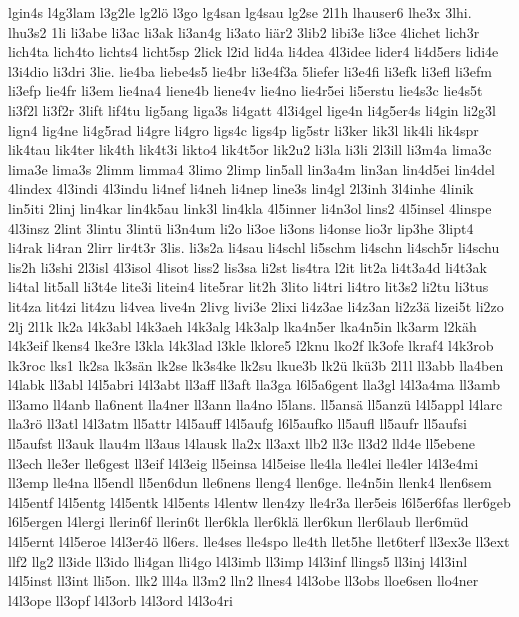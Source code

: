 {lgin4s
l4g3lam
l3g2le
lg2lö
l3go
lg4san
lg4sau
lg2se
2l1h
lhauser6
lhe3x
3lhi.
lhu3s2
1li
li3abe
li3ac
li3ak
li3an4g
li3ato
liär2
3lib2
libi3e
li3ce
4lichet
lich3r
lich4ta
lich4to
lichts4
licht5sp
2lick
l2id
lid4a
li4dea
4l3idee
lider4
li4d5ers
lidi4e
l3i4dio
li3dri
3lie.
lie4ba
liebe4s5
lie4br
li3e4f3a
5liefer
li3e4fi
li3efk
li3efl
li3efm
li3efp
lie4fr
li3em
lie4na4
liene4b
liene4v
lie4no
lie4r5ei
li5erstu
lie4s3c
lie4s5t
li3f2l
li3f2r
3lift
lif4tu
lig5ang
liga3s
li4gatt
4l3i4gel
lige4n
li4g5er4s
li4gin
li2g3l
lign4
lig4ne
li4g5rad
li4gre
li4gro
ligs4c
ligs4p
lig5str
li3ker
lik3l
lik4li
lik4spr
lik4tau
lik4ter
lik4th
lik4t3i
likto4
lik4t5or
lik2u2
li3la
li3li
2l3ill
li3m4a
lima3c
lima3e
lima3s
2limm
limma4
3limo
2limp
lin5all
lin3a4m
lin3an
lin4d5ei
lin4del
4lindex
4l3indi
4l3indu
li4nef
li4neh
li4nep
line3s
lin4gl
2l3inh
3l4inhe
4linik
lin5iti
2linj
lin4kar
lin4k5au
link3l
lin4kla
4l5inner
li4n3ol
lins2
4l5insel
4linspe
4l3insz
2lint
3lintu
3lintü
li3n4um
li2o
li3oe
li3ons
li4onse
lio3r
lip3he
3lipt4
li4rak
li4ran
2lirr
lir4t3r
3lis.
li3s2a
li4sau
li4schl
li5schm
li4schn
li4sch5r
li4schu
lis2h
li3shi
2l3isl
4l3isol
4lisot
liss2
lis3sa
li2st
lis4tra
l2it
lit2a
li4t3a4d
li4t3ak
li4tal
lit5all
li3t4e
lite3i
litein4
lite5rar
lit2h
3lito
li4tri
li4tro
lit3s2
li2tu
li3tus
lit4za
lit4zi
lit4zu
li4vea
live4n
2livg
livi3e
2lixi
li4z3ae
li4z3an
li2z3ä
lizei5t
li2zo
2lj
2l1k
lk2a
l4k3abl
l4k3aeh
l4k3alg
l4k3alp
lka4n5er
lka4n5in
lk3arm
l2käh
l4k3eif
lkens4
lke3re
l3kla
l4k3lad
l3kle
lklore5
l2knu
lko2f
lk3ofe
lkraf4
l4k3rob
lk3roc
lks1
lk2sa
lk3sän
lk2se
lk3s4ke
lk2su
lkue3b
lk2ü
lkü3b
2l1l
ll3abb
lla4ben
l4labk
ll3abl
l4l5abri
l4l3abt
ll3aff
ll3aft
lla3ga
l6l5a6gent
lla3gl
l4l3a4ma
ll3amb
ll3amo
ll4anb
lla6nent
lla4ner
ll3ann
lla4no
l5lans.
ll5ansä
ll5anzü
l4l5appl
l4larc
lla3rö
ll3atl
l4l3atm
ll5attr
l4l5auff
l4l5aufg
l6l5aufko
ll5aufl
ll5aufr
ll5aufsi
ll5aufst
ll3auk
llau4m
ll3aus
l4lausk
lla2x
ll3axt
llb2
ll3c
ll3d2
lld4e
ll5ebene
ll3ech
lle3er
lle6gest
ll3eif
l4l3eig
ll5einsa
l4l5eise
lle4la
lle4lei
lle4ler
l4l3e4mi
ll3emp
lle4na
ll5endl
ll5en6dun
lle6nens
lleng4
llen6ge.
lle4n5in
llenk4
llen6sem
l4l5entf
l4l5entg
l4l5entk
l4l5ents
l4lentw
llen4zy
lle4r3a
ller5eis
l6l5er6fas
ller6geb
l6l5ergen
l4lergi
llerin6f
llerin6t
ller6kla
ller6klä
ller6kun
ller6laub
ller6müd
l4l5ernt
l4l5eroe
l4l3er4ö
ll6ers.
lle4ses
lle4spo
lle4th
llet5he
llet6terf
ll3ex3e
ll3ext
llf2
llg2
ll3ide
ll3ido
lli4gan
lli4go
l4l3imb
ll3imp
l4l3inf
llings5
ll3inj
l4l3inl
l4l5inst
ll3int
lli5on.
llk2
lll4a
ll3m2
lln2
llnes4
l4l3obe
ll3obs
lloe6sen
llo4ner
l4l3ope
ll3opf
l4l3orb
l4l3ord
l4l3o4ri
}
